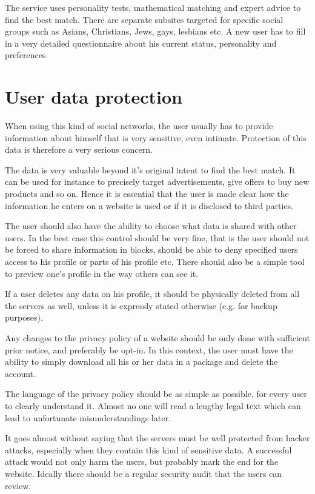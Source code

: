 \documentclass[12pt,oneside]{fithesis}
\begin{document}
		The service uses personality tests, mathematical matching and expert advice to find the best match. There are separate subsites targeted for specific social groups such as Asians, Christians, Jews, gays, lesbians etc. A new user has to fill in a very detailed questionnaire about his current status, personality and preferences.\cite{website:eharmony}
\section{User data protection}
	When using this kind of social networks, the user usually has to provide information about himself that is very sensitive, even intimate. Protection of this data is therefore a very serious concern.
	
	The data is very valuable beyond it's original intent to find the best match. It can be used for instance to precisely target advertisements, give offers to buy new products and so on. Hence it is essential that the user is made clear how the information he enters on a website is used or if it is disclosed to third parties.
	
	The user should also have the ability to choose what data is shared with other users. In the best case this control should be very fine, that is the user should not be forced to share information in blocks, should be able to deny specified users access to his profile or parts of his profile etc. There should also be a simple tool to preview one's profile in the way others can see it.
	
	If a user deletes any data on his profile, it should be physically deleted from all the servers as well, unless it is expressly stated otherwise (e.g. for backup purposes).
	
	Any changes to the privacy policy of a website should be only done with sufficient prior notice, and preferably be opt-in. In this context, the user must have the ability to simply download all his or her data in a package and delete the account.
	
	The language of the privacy policy should be as simple as possible, for every user to clearly understand it. Almost no one will read a lengthy legal text which can lead to unfortunate misunderstandings later.
	
	It goes almost without saying that the servers must be well protected from hacker attacks, especially when they contain this kind of sensitive data. A successful attack would not only harm the users, but probably mark the end for the website. Ideally there should be a regular security audit that the users can review.
\end{document}
